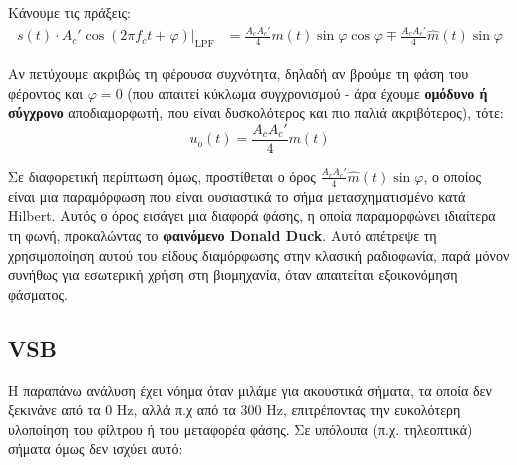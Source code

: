 \documentclass[11pt,a4paper,notitlepage,fleqn,final]{article}
\begin{document}
Κάνουμε τις πράξεις:
\begin{align*}
	\left. s(t)\cdot A_c' \cos(2πf_ct+φ) \right|_{\mathrm{LPF}}
	&= \frac{A_cA_c'}{4}m(t)\sin φ\cos φ
	\mp \frac{A_cA_c'}{4}\hat m(t) \sin φ
\end{align*}

Αν πετύχουμε ακριβώς τη φέρουσα συχνότητα, δηλαδή αν βρούμε τη φάση του φέροντος και
\( φ = 0 \) (που απαιτεί κύκλωμα συγχρονισμού - άρα έχουμε \textbf{ομόδυνο ή σύγχρονο}
αποδιαμορφωτή, που είναι δυσκολότερος και πιο παλιά ακριβότερος), τότε:
\[
u_o(t) = \frac{A_cA_c'}{4}m(t)
\]

Σε διαφορετική περίπτωση όμως, προστίθεται ο όρος \( \frac{A_cA_c'}{4}\hat m(t) \sin φ \),
ο οποίος είναι μια παραμόρφωση που είναι ουσιαστικά το σήμα μετασχηματισμένο κατά
Hilbert. Αυτός ο όρος εισάγει μια διαφορά φάσης, η οποία παραμορφώνει ιδιαίτερα τη
φωνή, προκαλώντας το \textbf{φαινόμενο Donald Duck}.
Αυτό απέτρεψε τη χρησιμοποίηση αυτού του είδους διαμόρφωσης στην κλασική ραδιοφωνία, παρά
μόνον συνήθως για εσωτερική χρήση στη βιομηχανία, όταν απαιτείται εξοικονόμηση φάσματος.

\subsection{VSB}
Η παραπάνω ανάλυση έχει νόημα όταν μιλάμε για ακουστικά σήματα, τα οποία δεν ξεκινάνε από
τα 0 Hz, αλλά π.χ από τα 300 Hz, επιτρέποντας την ευκολότερη υλοποίηση του φίλτρου ή του
μεταφορέα φάσης. Σε υπόλοιπα (π.χ. τηλεοπτικά) σήματα όμως δεν ισχύει αυτό:

\begin{center}
\end{center}
\end{document}
